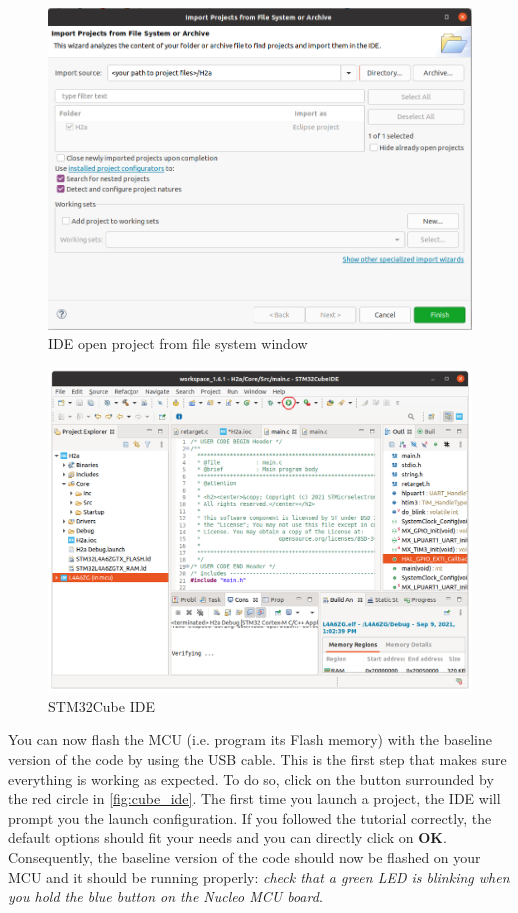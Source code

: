 \begin{figure}[h]
    \centering
    \includegraphics[scale=0.4]{figures/import_ide.png}
    \caption{IDE open project from file system window}
    \label{fig:import_ide}
\end{figure}
\begin{figure}[h]
    \centering
    \includegraphics[scale=0.35]{figures/ide.png}
    \caption{STM32Cube IDE}
    \label{fig:cube_ide}
\end{figure}

You can now flash the MCU (i.e. program its Flash memory) with the baseline version of the code by using the USB cable. This is the first step that makes sure everything is working as expected. To do so, click on the button surrounded by the red circle in \autoref{fig:cube_ide}. The first time you launch a project, the IDE will prompt you the launch configuration. If you followed the tutorial correctly, the default options should fit your needs and you can directly click on \textbf{OK}. Consequently, the baseline version of the code should now be flashed on your MCU and it should be running properly: \textit{check that a green LED is blinking when you hold the blue button on the Nucleo MCU board}.

